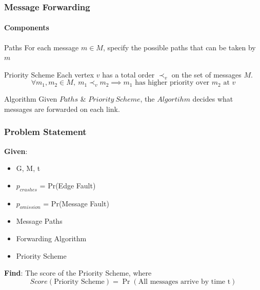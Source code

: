 \documentclass{beamer}
\begin{document}
\begin{frame}
\frametitle{Message Forwarding}
	\framesubtitle{Components}
	\begin{block}{Paths}
	For each message $ m\in M $, specify the possible paths that can be taken by $ m $
	\end{block}

	\begin{block}{Priority Scheme}
	Each vertex $ v $ has a total order $ \prec _{v} $ on the set of
	messages $ M $. $$\forall m_1,m_2 \in M,\ m_1\prec _{v}m_2 \implies m_1 \text{ has higher priority over } m_2 \text{ at } v$$
	\end{block}

	\begin{block}{Algorithm}
	Given $Paths$ \& $Priority\ Scheme$, the $Algortihm$ decides what messages are forwarded on each link.
	\end{block}
\end{frame}

\begin{frame}
\frametitle{Problem Statement}
	\textbf{Given}:
	\begin{itemize}
		\item G, M, t
		\item $p_{crashes}$ = Pr(Edge Fault)
		\item $p_{omission}$ = Pr(Message Fault)
		\item Message Paths
		\item Forwarding Algorithm
		\item Priority Scheme\\[3ex]
	\end{itemize}
	\textbf{Find}:
	The score of the Priority Scheme, where\\
		$$Score(\text{Priority Scheme}) = \Pr(\text{All messages arrive by time t})$$
\end{frame}

\end{document}
